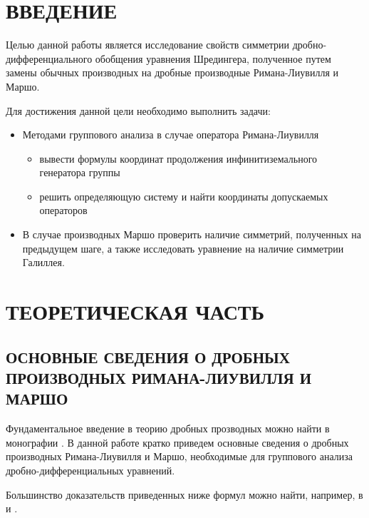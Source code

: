 \documentclass[a4paper, fontsize=14pt]{article}
\begin{document}

\tableofcontents

\newpage
\section*{ВВЕДЕНИЕ}


Целью данной работы является исследование свойств симметрии дробно-дифференциального обобщения уравнения Шредингера, полученное путем замены обычных производных на дробные производные Римана-Лиувилля и Маршо.

Для достижения данной цели необходимо выполнить задачи:

\begin{itemize}
  \item Методами группового анализа в случае оператора Римана-Лиувилля
  \begin{itemize}
    \item вывести формулы координат продолжения инфинитиземального генератора группы
    \item решить определяющую систему и найти координаты допускаемых операторов
  \end{itemize}
  \item В случае производных Маршо проверить наличие симметрий, полученных на предыдущем шаге, а также исследовать уравнение на наличие симметрии Галиллея.
\end{itemize}


\newpage
\section[Теоретическая часть]{ТЕОРЕТИЧЕСКАЯ ЧАСТЬ}

\subsection[Основные сведения о дробных производных Римана-Лиувилля и Маршо]{ОСНОВНЫЕ СВЕДЕНИЯ О ДРОБНЫХ ПРОИЗВОДНЫХ РИМАНА-ЛИУВИЛЛЯ И МАРШО}

Фундаментальное введение в теорию дробных прозводных можно найти в монографии \cite{samko}.
В данной работе кратко приведем основные сведения о дробных производных  Римана-Лиувилля и Маршо, необходимые
для группового анализа дробно-дифференциальных уравнений.

Большинство доказательств приведенных ниже формул можно найти, например, в \cite{kasatkin-disert} и \cite{luka}.
\end{document}
